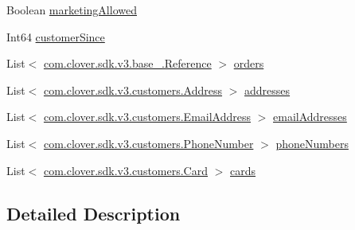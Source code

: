 \begin{DoxyCompactItemize}
Boolean \hyperlink{classcom_1_1clover_1_1sdk_1_1v3_1_1customers_1_1_customer_a71a7b15d6fe74876e6d06a8ed95b5f7f}{marketing\+Allowed}
\item 
Int64 \hyperlink{classcom_1_1clover_1_1sdk_1_1v3_1_1customers_1_1_customer_a3605b2e2693c7ab112553eba83dd2418}{customer\+Since}
\item 
List$<$ \hyperlink{classcom_1_1clover_1_1sdk_1_1v3_1_1base___1_1_reference}{com.\+clover.\+sdk.\+v3.\+base\+\_\+.\+Reference} $>$ \hyperlink{classcom_1_1clover_1_1sdk_1_1v3_1_1customers_1_1_customer_a161dbf9903d526cff029bc3d6ee47f4d}{orders}
\item 
List$<$ \hyperlink{classcom_1_1clover_1_1sdk_1_1v3_1_1customers_1_1_address}{com.\+clover.\+sdk.\+v3.\+customers.\+Address} $>$ \hyperlink{classcom_1_1clover_1_1sdk_1_1v3_1_1customers_1_1_customer_ae28534f8fcb595e4830f38af432b14e8}{addresses}
\item 
List$<$ \hyperlink{classcom_1_1clover_1_1sdk_1_1v3_1_1customers_1_1_email_address}{com.\+clover.\+sdk.\+v3.\+customers.\+Email\+Address} $>$ \hyperlink{classcom_1_1clover_1_1sdk_1_1v3_1_1customers_1_1_customer_a8220e53d898cab125d969e8a1e7fb343}{email\+Addresses}
\item 
List$<$ \hyperlink{classcom_1_1clover_1_1sdk_1_1v3_1_1customers_1_1_phone_number}{com.\+clover.\+sdk.\+v3.\+customers.\+Phone\+Number} $>$ \hyperlink{classcom_1_1clover_1_1sdk_1_1v3_1_1customers_1_1_customer_acab51810c72a41fd25a741aa1d4e618f}{phone\+Numbers}
\item 
List$<$ \hyperlink{classcom_1_1clover_1_1sdk_1_1v3_1_1customers_1_1_card}{com.\+clover.\+sdk.\+v3.\+customers.\+Card} $>$ \hyperlink{classcom_1_1clover_1_1sdk_1_1v3_1_1customers_1_1_customer_a71334cf01f9ac4cee4ab11d39e9c1f6c}{cards}
\end{DoxyCompactItemize}


\subsection{Detailed Description}


